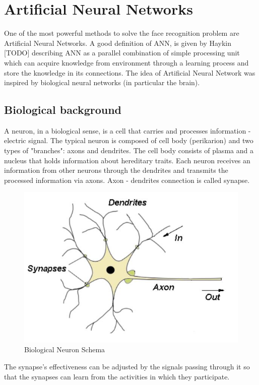 \chapter{Artificial Neural Networks}

One of the most powerful methods to solve the face recognition problem are Artificial Neural Networks. 
A good definition of ANN, is given by Haykin [TODO] describing ANN as a parallel combination of simple  processing unit which can acquire knowledge from environment through a learning process and store the knowledge in its connections. The idea of Artificial Neural Network was inspired by biological neural networks (in particular the brain). 

\section{Biological background}
A neuron, in a biological sense, is a cell that carries and processes information - electric signal. The typical neuron is composed of cell body (perikarion) and two types of "branches": axons and dendrites. The cell body consists of plasma and a nucleus that holds information about hereditary traits. Each neuron receives an information from other neurons through the dendrites and transmits the processed information via axons. Axon - dendrites connection is called synapse. 

\begin{figure}[H]
\centering
\includegraphics[scale=1]{neuron_schema.jpg}
\caption{Biological Neuron Schema}
\end{figure} 

The synapse's effectiveness can be adjusted by the signals passing through it so that the synapses can learn from the activities in which they participate. 


